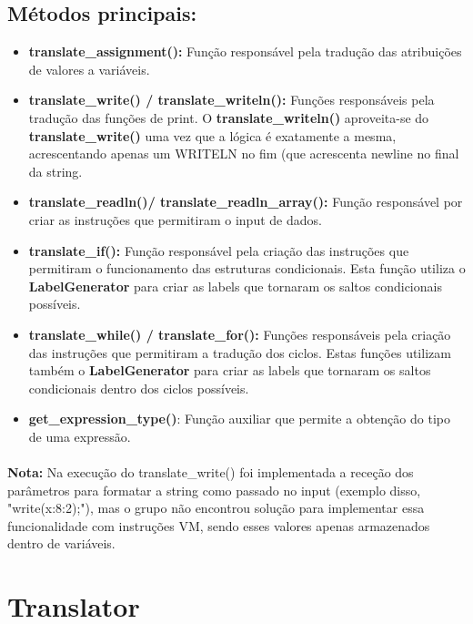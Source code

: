 \subsection*{Métodos principais:}
\begin{itemize}
    \item \textbf{translate\_assignment():} Função responsável pela tradução das atribuições de valores a variáveis.
    \item \textbf{translate\_write() / translate\_writeln():} Funções responsáveis pela tradução das funções de print. O \textbf{translate\_writeln()} aproveita-se do \textbf{translate\_write()} uma vez que a lógica é exatamente a mesma, acrescentando apenas um WRITELN no fim (que acrescenta newline no final da string.
     \item \textbf{translate\_readln()/ translate\_readln\_array():} Função responsável por criar as instruções que permitiram o input de dados.
    \item \textbf{translate\_if():} Função responsável pela criação das instruções que permitiram o funcionamento das estruturas condicionais. Esta função utiliza o \textbf{LabelGenerator} para criar as labels que tornaram os saltos condicionais possíveis.
    \item \textbf{translate\_while() / translate\_for():} Funções responsáveis pela criação das instruções que permitiram a tradução dos ciclos. Estas funções utilizam também o \textbf{LabelGenerator} para criar as labels que tornaram os saltos condicionais dentro dos ciclos possíveis.
     \item \textbf{get\_expression\_type()}: Função auxiliar que permite a obtenção do tipo de uma expressão.
\end{itemize}

\paragraph{}

\textbf{Nota:} Na execução do translate\_write() foi implementada a receção dos parâmetros para formatar a string como passado no input (exemplo disso, "write(x:8:2);"), mas o grupo não encontrou solução para implementar essa funcionalidade com instruções VM, sendo esses valores apenas armazenados dentro de variáveis.

\newpage
\section{Translator}

